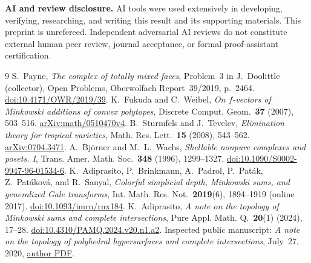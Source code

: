 \documentclass[11pt]{article}
\begin{document}
\textbf{AI and review disclosure.} AI tools were used extensively in
developing, verifying, researching, and writing this result and its
supporting materials. This preprint is unrefereed. Independent
adversarial AI reviews do not constitute external human peer review,
journal acceptance, or formal proof-assistant certification.

\clearpage
\begin{thebibliography}{9}
 S.~Payne, \emph{The complex of totally mixed faces},
Problem~3 in J.~Doolittle (collector), Open Problems, Oberwolfach
Report~39/2019, p.~2464.
\href{https://doi.org/10.4171/OWR/2019/39}{doi:10.4171/OWR/2019/39}.
 K.~Fukuda and C.~Weibel, \emph{On $f$-vectors of Minkowski
additions of convex polytopes}, Discrete Comput. Geom.\
\textbf{37} (2007), 503--516.
\href{https://arxiv.org/abs/math/0510470v4}{arXiv:math/0510470v4}.
\bibitem{ST} B.~Sturmfels and J.~Tevelev, \emph{Elimination theory for
tropical varieties}, Math. Res. Lett.\ \textbf{15} (2008), 543--562.
\href{https://arxiv.org/abs/0704.3471}{arXiv:0704.3471}.
 A.~Bj\"orner and M.~L.~Wachs, \emph{Shellable nonpure
complexes and posets. I}, Trans. Amer. Math. Soc.\
\textbf{348} (1996), 1299--1327.
\href{https://doi.org/10.1090/S0002-9947-96-01534-6}{doi:10.1090/S0002-9947-96-01534-6}.
\bibitem{AB} K.~Adiprasito, P.~Brinkmann, A.~Padrol, P.~Pat\'ak,
Z.~Pat\'akov\'a, and R.~Sanyal, \emph{Colorful simplicial depth,
Minkowski sums, and generalized Gale transforms}, Int. Math. Res.
Not.\ \textbf{2019}(6), 1894--1919 (online 2017).
\href{https://doi.org/10.1093/imrn/rnx184}{doi:10.1093/imrn/rnx184}.
\bibitem{A} K.~Adiprasito, \emph{A note on the topology of Minkowski
sums and complete intersections}, Pure Appl. Math. Q.\
\textbf{20}(1) (2024), 17--28.
\href{https://doi.org/10.4310/PAMQ.2024.v20.n1.a2}{doi:10.4310/PAMQ.2024.v20.n1.a2}.
Inspected public manuscript: \emph{A note on the topology of polyhedral
hypersurfaces and complete intersections}, July~27, 2020,
\href{https://webusers.imj-prg.fr/~karim.adiprasito/cint.pdf}{author PDF}.
\end{thebibliography}
\end{document}
